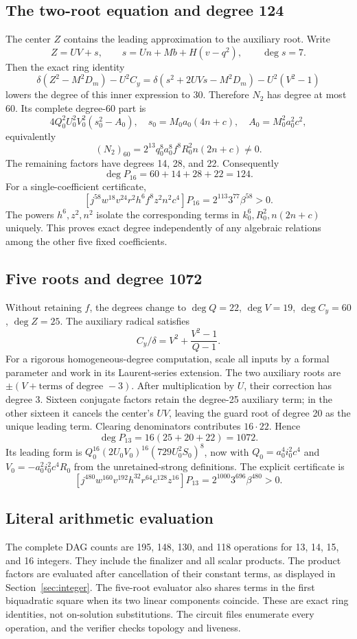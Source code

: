 \subsection{The two-root equation and degree 124}
The center $Z$ contains the leading approximation to the auxiliary root.
Write
\[
 Z=UV+s,\qquad s=Un+Mb+H(v-q^2),\qquad\deg s=7.
\]
Then the exact ring identity
\begin{equation}
 \delta(Z^2-M^2D_m)-U^2C_y
 =\delta(s^2+2UVs-M^2D_m)-U^2(V^2-1)
 \label{eq:centeridentity}
\end{equation}
lowers the degree of this inner expression to 30. Therefore $N_2$ has
degree at most 60. Its complete degree-60 part is
\[
 4Q_0^2U_0^2V_0^2(s_0^2-A_0),\quad
 s_0=M_0a_0(4n+c),\quad A_0=M_0^2a_0^2c^2,
\]
equivalently
\[
 (N_2)_{60}=2^{13}q_0^8a_0^8f^8R_0^2n(2n+c)\ne0.
\]
The remaining factors have degrees 14, 28, and 22. Consequently
\[
 \deg P_{16}=60+14+28+22=124.
\]
For a single-coefficient certificate,
\[
 [j^{58}w^{18}v^{24}r^2h^6f^8z^2n^2c^4]P_{16}
 =2^{113}3^{77}\beta^{58}>0.
\]
The powers $h^6,z^2,n^2$ isolate the corresponding terms in
$k_0^6,R_0^2,n(2n+c)$ uniquely. This proves exact degree independently
of any algebraic relations among the other five fixed coefficients.

\subsection{Five roots and degree 1072}
Without retaining $f$, the degrees change to
$\deg Q=22$, $\deg V=19$, $\deg C_y=60$, $\deg Z=25$.
The auxiliary radical satisfies
\[
 C_y/\delta=V^2+\frac{V^2-1}{Q-1}.
\]
For a rigorous homogeneous-degree computation, scale all inputs by a
formal parameter and work in its Laurent-series extension. The two
auxiliary roots are $\pm(V+\text{terms of degree }-3)$.
After multiplication by $U$, their correction has degree 3.
Sixteen conjugate factors retain the degree-25 auxiliary term; in the
other sixteen it cancels the center's $UV$, leaving the guard root of
degree 20 as the unique leading term. Clearing denominators contributes
$16\cdot22$. Hence
\[
 \deg P_{13}=16(25+20+22)=1072.
\]
Its leading form is
$Q_0^{16}(2U_0V_0)^{16}(729U_0^2S_0)^8$, now with
$Q_0=a_0^4i_0^2c^4$ and $V_0=-a_0^2i_0^2c^4R_0$ from the
unretained-strong definitions. The explicit certificate is
\[
 [j^{480}w^{160}v^{192}h^{32}r^{64}c^{128}z^{16}]P_{13}
 =2^{1000}3^{696}\beta^{480}>0.
\]

\subsection{Literal arithmetic evaluation}
The complete DAG counts are 195, 148, 130, and 118 operations for
13, 14, 15, and 16 integers. They include the finalizer and all scalar
products. The product factors are evaluated after cancellation of their
constant terms, as displayed in Section~\ref{sec:integer}.
The five-root evaluator also shares terms in the first biquadratic
square when its two linear components coincide. These are exact ring
identities, not on-solution substitutions. The circuit files enumerate
every operation, and the verifier checks topology and liveness.

